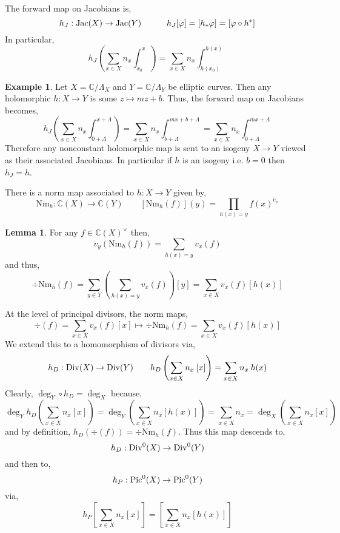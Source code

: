 \documentclass{article}
\newcommand{\C}{\mathbb{C}}
\theoremstyle{definition}
\newtheorem{lemma}[theorem]{Lemma}
\newtheorem{example}[theorem]{Example}
\newenvironment{definition}[1][Definition:]{\begin{trivlist}
\item[\hskip \labelsep {\bfseries #1}]}{\end{trivlist}}
\begin{document}
\begin{definition}
The forward map on Jacobians is,
\[ h_J : \mathrm{Jac}(X) \to \mathrm{Jac}(Y) \quad \quad \quad h_J [\varphi] = [h_* \varphi] = [ \varphi \circ h^* ] \]
In particular,
\[ h_J \left( \sum_{x \in X} n_x \int_{x_0}^x \right) = \sum_{x \in X} n_x \int_{h(x_0)}^{h(x)} \]
\end{definition}

\begin{example}
Let $X = \C / \Lambda_X$ and $Y = \C / \Lambda_Y$ be elliptic curves. Then any holomorphic $h : X \to Y$ is some $z \mapsto mz + b$. Thus, the forward map on Jacobians becomes,
\[ h_J \left( \sum_{x \in X} n_x \int_{0 + \Lambda}^{x + \Lambda} \right) = \sum_{x \in X} n_x \int_{b + \Lambda}^{m x + b + \Lambda} = \sum_{x \in X} n_x \int_{0 + \Lambda}^{m x + \Lambda} \]
Therefore any nonconstant holomorphic map is sent to an isogeny $X \to Y$ viewed as their associated Jacobians. In particular if $h$ is an isogeny i.e. $b = 0$ then $h_J = h$. 
\end{example}

\newcommand{\Nm}{\mathrm{Nm}}

\begin{definition}
There is a norm map associated to $h : X \to Y$ given by,
\[ \Nm_h : \C(X) \to \C(Y) \quad \quad [\Nm_h(f)](y) = \prod_{h(x) = y} f(x)^{e_x} \]
\end{definition}

\begin{lemma}
For any $f \in \C(X)^\times$ then,
\[ v_y(\Nm_h(f)) = \sum_{h(x) = y} v_x(f) \]
and thus,
\[ \div{\Nm_h(f)} = \sum_{y \in Y} \left( \sum_{h(x) = y} v_x(f) \right) [y] = \sum_{x \in X} v_x(f) [h(x)] \]
\end{lemma}

\begin{definition}
At the level of principal divisors, the norm maps,
\[ \div{(f)} = \sum_{x \in X} v_x(f) [x] \mapsto \div{\Nm_h(f)} =  \sum_{x \in X} v_x(f) [h(x)] \]
We extend this to a homomorphism of divisors via,
\[ h_D : \mathrm{Div}(X) \to \mathrm{Div}(Y) \quad  \quad h_D\left( \sum_{x \in X} n_x \: [x] \right) = \sum_{x \in X} n_x \: h(x) \]
Clearly, $\deg_Y \circ h_D = \deg_X$ because,
\[ \deg_Y{h_D\left( \sum_{x \in X} n_x [x] \right)} = \deg_Y{\left( \sum_{x \in X} n_x [h(x)] \right)} = \sum_{x \in X} n_x = \deg_X{\left( \sum_{x \in X} n_x [x] \right)} \]
and by definition, $h_D(\div{(f)}) = \div{\Nm_h(f)}$. Thus this map descends to,
\[ h_D : \mathrm{Div}^0(X) \to \mathrm{Div}^0(Y) \]
and then to,
\[ h_P : \mathrm{Pic}^0(X) \to \mathrm{Pic}^0(Y) \]
via,
\[ h_P \left[ \sum_{x \in X} n_x [x] \right] = \left[ \sum_{x \in X} n_x [h(x)] \right] \]
\end{definition}
\end{document}
